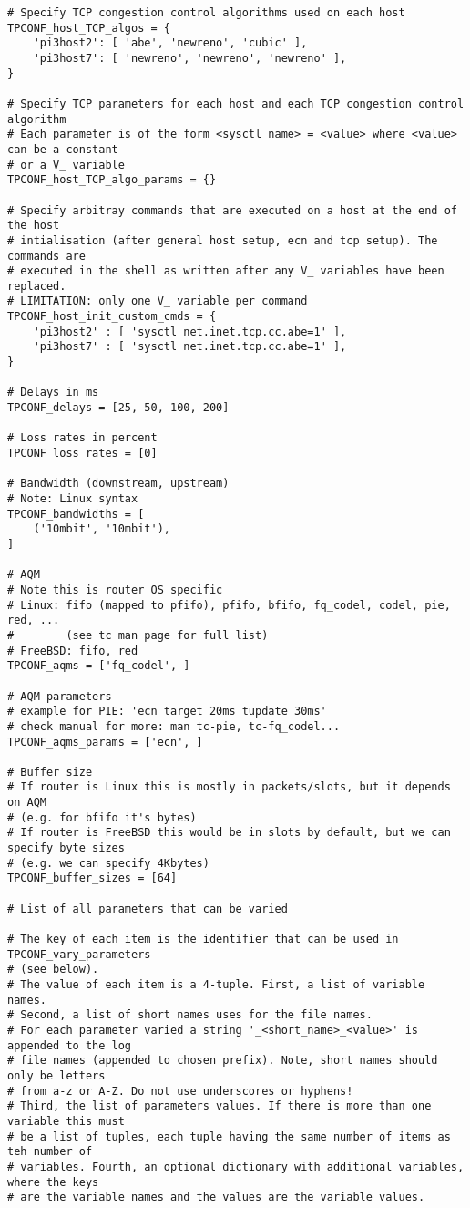 \begin{code}
\begin{verbatim}
# Specify TCP congestion control algorithms used on each host
TPCONF_host_TCP_algos = {
    'pi3host2': [ 'abe', 'newreno', 'cubic' ],
    'pi3host7': [ 'newreno', 'newreno', 'newreno' ],
}

# Specify TCP parameters for each host and each TCP congestion control algorithm
# Each parameter is of the form <sysctl name> = <value> where <value> can be a constant
# or a V_ variable
TPCONF_host_TCP_algo_params = {}

# Specify arbitray commands that are executed on a host at the end of the host 
# intialisation (after general host setup, ecn and tcp setup). The commands are
# executed in the shell as written after any V_ variables have been replaced.
# LIMITATION: only one V_ variable per command
TPCONF_host_init_custom_cmds = {
    'pi3host2' : [ 'sysctl net.inet.tcp.cc.abe=1' ],
    'pi3host7' : [ 'sysctl net.inet.tcp.cc.abe=1' ],
}

# Delays in ms
TPCONF_delays = [25, 50, 100, 200]

# Loss rates in percent
TPCONF_loss_rates = [0]

# Bandwidth (downstream, upstream)
# Note: Linux syntax
TPCONF_bandwidths = [
    ('10mbit', '10mbit'),
]

# AQM
# Note this is router OS specific
# Linux: fifo (mapped to pfifo), pfifo, bfifo, fq_codel, codel, pie, red, ...
#        (see tc man page for full list)
# FreeBSD: fifo, red
TPCONF_aqms = ['fq_codel', ]

# AQM parameters
# example for PIE: 'ecn target 20ms tupdate 30ms'
# check manual for more: man tc-pie, tc-fq_codel...
TPCONF_aqms_params = ['ecn', ]

# Buffer size
# If router is Linux this is mostly in packets/slots, but it depends on AQM
# (e.g. for bfifo it's bytes)
# If router is FreeBSD this would be in slots by default, but we can specify byte sizes
# (e.g. we can specify 4Kbytes)
TPCONF_buffer_sizes = [64]

# List of all parameters that can be varied

# The key of each item is the identifier that can be used in TPCONF_vary_parameters
# (see below).
# The value of each item is a 4-tuple. First, a list of variable names.
# Second, a list of short names uses for the file names.
# For each parameter varied a string '_<short_name>_<value>' is appended to the log
# file names (appended to chosen prefix). Note, short names should only be letters
# from a-z or A-Z. Do not use underscores or hyphens!
# Third, the list of parameters values. If there is more than one variable this must
# be a list of tuples, each tuple having the same number of items as teh number of
# variables. Fourth, an optional dictionary with additional variables, where the keys
# are the variable names and the values are the variable values.


\end{verbatim}
\end{code}
